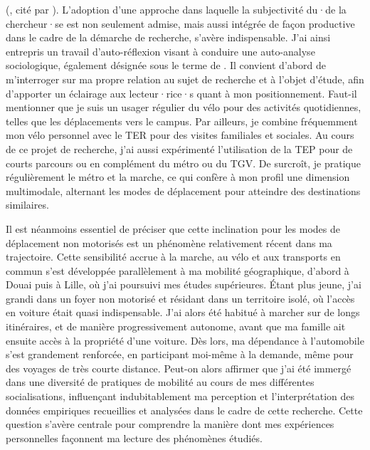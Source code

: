 \begin{refsegment}
  (\textcolor{blue}{\textcite{perrault_jhabite_1965}}, cité par \textcolor{blue}{\textcite[181]{ducharme_ville_2021}}). L'adoption d'une approche dans laquelle la subjectivité du·de la chercheur·se est non seulement admise, mais aussi intégrée de façon productive dans le cadre de la démarche de recherche, s'avère indispensable. J'ai ainsi entrepris un travail d'auto-réflexion visant à conduire une auto-analyse sociologique, également désignée sous le terme de . Il convient d'abord de m'interroger sur ma propre relation au sujet de recherche et à l'objet d'étude, afin d'apporter un éclairage aux lecteur·rice·s quant à mon positionnement. Faut-il mentionner que je suis un usager régulier du vélo pour des activités quotidiennes, telles que les déplacements vers le campus. Par ailleurs, je combine fréquemment mon vélo personnel avec le \acrfull{TER} pour des visites familiales et sociales. Au cours de ce projet de recherche, j'ai aussi expérimenté l'utilisation de la \acrfull{TEP} pour de courts parcours ou en complément du métro ou du \acrfull{TGV}. De surcroît, je pratique régulièrement le métro et la marche, ce qui confère à mon profil une dimension multimodale, alternant les modes de déplacement pour atteindre des destinations similaires.%

Il est néanmoins essentiel de préciser que cette inclination pour les modes de déplacement non motorisés est un phénomène relativement récent dans ma trajectoire. Cette sensibilité accrue à la marche, au vélo et aux transports en commun s'est développée parallèlement à ma mobilité géographique, d'abord à Douai puis à Lille, où j'ai poursuivi mes études supérieures. Étant plus jeune, j'ai grandi dans un foyer non motorisé et résidant dans un territoire isolé, où l'accès en voiture était quasi indispensable. J'ai alors été habitué à marcher sur de longs itinéraires, et de manière progressivement autonome, avant que ma famille ait ensuite accès à la propriété d'une voiture. Dès lors, ma dépendance à l'automobile s'est grandement renforcée, en participant moi-même à la demande, même pour des voyages de très courte distance. Peut-on alors affirmer que j'ai été immergé dans une diversité de pratiques de mobilité au cours de mes différentes socialisations, influençant indubitablement ma perception et l'interprétation des données empiriques recueillies et analysées dans le cadre de cette recherche. Cette question s'avère centrale pour comprendre la manière dont mes expériences personnelles façonnent ma lecture des phénomènes étudiés.%


\end{refsegment}
